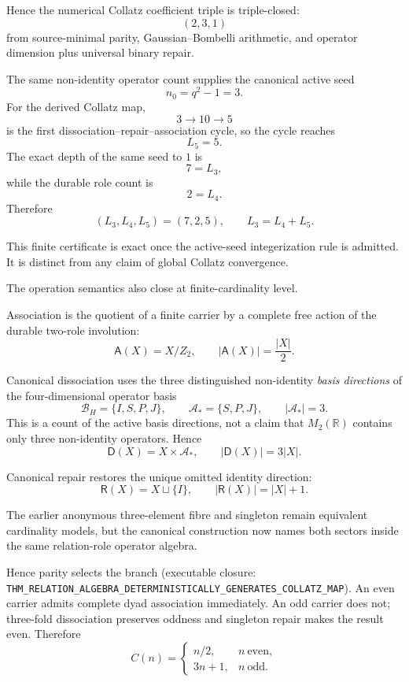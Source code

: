 \documentclass[11pt]{article}
\newcommand{\claimid}[1]{\nolinkurl{#1}}
\begin{document}
Hence the numerical Collatz coefficient triple is triple-closed:
\[
\boxed{
(2,3,1)
}
\]
from source-minimal parity, Gaussian--Bombelli arithmetic, and operator
dimension plus universal binary repair.

The same non-identity operator count supplies the canonical active seed
\[
\boxed{
n_0=q^2-1=3.
}
\]
For the derived Collatz map,
\[
3\to10\to5
\]
is the first dissociation--repair--association cycle, so the cycle reaches
\[
\boxed{L_5=5.}
\]
The exact depth of the same seed to \(1\) is
\[
\boxed{7=L_3,}
\]
while the durable role count is
\[
\boxed{2=L_4.}
\]
Therefore
\[
\boxed{
(L_3,L_4,L_5)=(7,2,5),
\qquad
L_3=L_4+L_5.
}
\]

This finite certificate is exact once the active-seed integerization rule is
admitted. It is distinct from any claim of global Collatz convergence.

The operation semantics also close at finite-cardinality level.

Association is the quotient of a finite carrier by a complete free action of
the durable two-role involution:
\[
\boxed{
\mathsf A(X)=X/Z_2,
\qquad
|\mathsf A(X)|=\frac{|X|}{2}.
}
\]

Canonical dissociation uses the three distinguished non-identity
\emph{basis directions} of the four-dimensional operator basis
\[
\mathcal B_H=\{I,S,P,J\},
\qquad
\mathcal A_*=\{S,P,J\},
\qquad
|\mathcal A_*|=3.
\]
This is a count of the active basis directions, not a claim that
\(M_2(\mathbb R)\) contains only three non-identity operators.
Hence
\[
\boxed{
\mathsf D(X)=X\times\mathcal A_*,
\qquad
|\mathsf D(X)|=3|X|.
}
\]

Canonical repair restores the unique omitted identity direction:
\[
\boxed{
\mathsf R(X)=X\sqcup\{I\},
\qquad
|\mathsf R(X)|=|X|+1.
}
\]

The earlier anonymous three-element fibre and singleton remain equivalent
cardinality models, but the canonical construction now names both sectors
inside the same relation-role operator algebra.

Hence parity selects the branch (executable closure:
\claimid{THM_RELATION_ALGEBRA_DETERMINISTICALLY_GENERATES_COLLATZ_MAP}).
An even carrier admits complete dyad association immediately. An odd carrier does not; three-fold dissociation
preserves oddness and singleton repair makes the result even. Therefore
\[
\boxed{
C(n)=
\begin{cases}
n/2,&n\ \mathrm{even},\\
3n+1,&n\ \mathrm{odd}.
\end{cases}
}
\]
\end{document}
